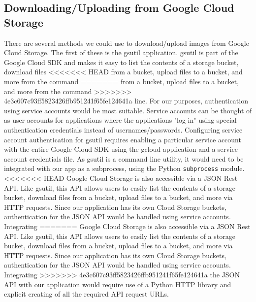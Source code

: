 \documentclass[10pt, onecolumn, draftclsnofoot, letterpaper, compsoc]{IEEEtran}
\begin{document}
\subsection{Downloading/Uploading from Google Cloud Storage}

There are several methods we could use to download/upload images from Google Cloud
Storage. The first of these is the gsutil application. gsutil is part of the Google
Cloud SDK and makes it easy to list the contents of a storage bucket, download files
<<<<<<< HEAD
from a bucket, upload files to a bucket, and more from the command
=======
from a bucket, upload files to a bucket, and more from the command
>>>>>>> 4e3c607c93ff5823426ffb951241f65fe124641a
line\cite{gsutil, cloudStorage}. For our purposes, authentication using
service accounts would be most suitable. Service accounts can be
thought of as user accounts for applications where the applications "log in"
using special authentication credentials instead of usernames/passwords. Configuring
service account authentication for gsutil requires enabling a particular service
account with the entire Google Cloud SDK using the gcloud application and a service
account credentials file. As gsutil is a command line utility, it would need to be
integrated with our app as a subprocess, using the Python {\tt subprocess} module. \\

<<<<<<< HEAD
Google Cloud Storage is also accessible via a JSON Rest API. Like gsutil, this API
allows users to easily list the contents of a storage bucket, download files from
a bucket, upload files to a bucket, and more via HTTP requests\cite{cloudStorageJSON}.
Since our application has its own Cloud Storage buckets, authentication for the
JSON API would be handled using service accounts\cite{cloudStorageJSON}. Integrating
=======
Google Cloud Storage is also accessible via a JSON Rest API. Like gsutil, this API
allows users to easily list the contents of a storage bucket, download files from
a bucket, upload files to a bucket, and more via HTTP requests\cite{cloudStorageJSON}.
Since our application has its own Cloud Storage buckets, authentication for the
JSON API would be handled using service accounts\cite{cloudStorageJSON}. Integrating
>>>>>>> 4e3c607c93ff5823426ffb951241f65fe124641a
the JSON API with our application would require use of a Python HTTP library and explicit creating
of all the required API request URLs\cite{cloudStorageJSON}. \\
\end{document}
